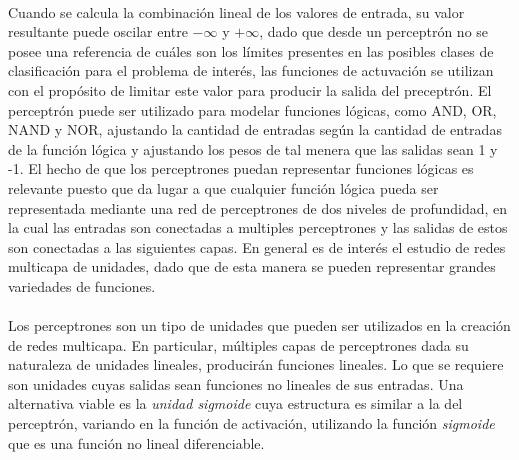\paragraph{}Cuando se calcula la combinación lineal de los valores de entrada, su valor resultante puede oscilar entre $-\infty$ y $+\infty$, dado que desde un perceptrón no se posee una referencia de cuáles son los límites presentes en las posibles clases de clasificación para el problema de interés, las funciones de actuvación se utilizan con el propósito de limitar este valor para producir la salida del preceptrón. El perceptrón puede ser utilizado para modelar funciones lógicas, como AND, OR, NAND y NOR, ajustando la cantidad de entradas según la cantidad de entradas de la función lógica y ajustando los pesos de tal menera que las salidas sean 1 y -1. El hecho de que los perceptrones puedan representar funciones lógicas es relevante puesto que da lugar a que cualquier función lógica pueda ser representada mediante una red de perceptrones de dos niveles de profundidad, en la cual las entradas son conectadas a multiples perceptrones y las salidas de estos son conectadas a las siguientes capas. En general es de interés el estudio de redes multicapa de unidades, dado que de esta manera se pueden representar grandes variedades de funciones.

\paragraph{}Los perceptrones son un tipo de unidades que pueden ser utilizados en la creación de redes multicapa. En particular, múltiples capas de perceptrones dada su naturaleza de unidades lineales, producirán funciones lineales. Lo que se requiere son unidades cuyas salidas sean funciones no lineales de sus entradas. Una alternativa viable es la \textit{unidad sigmoide} cuya estructura es similar a la del perceptrón, variando en la función de activación, utilizando la función \textit{sigmoide} que es una función no lineal diferenciable. 

